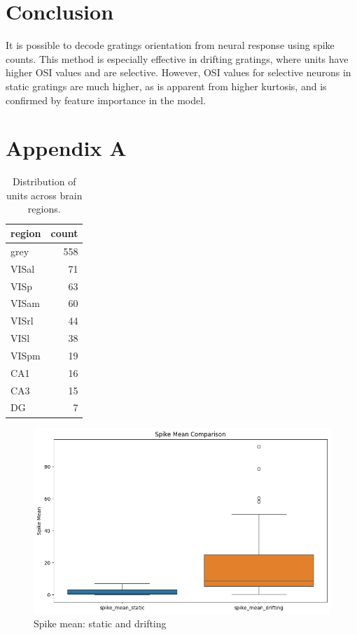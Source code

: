 \documentclass[10pt,twocolumn]{article}
\begin{document}
\section{Conclusion}

It is possible to decode gratings orientation from neural response using spike counts. This method is especially effective in drifting gratings, where units have higher OSI values and are selective. However, OSI values for selective neurons in static gratings are much higher, as is apparent from higher kurtosis, and is confirmed by feature importance in the model.

\newpage

\appendix

\section{Appendix A}

\begin{table}[h]
\centering
\begin{tabular}{lr}
\toprule
region & count \\
\midrule
grey   & 558 \\
VISal  &  71 \\
VISp   &  63 \\
VISam  &  60 \\
VISrl  &  44 \\
VISl   &  38 \\
VISpm  &  19 \\
CA1    &  16 \\
CA3    &  15 \\
DG     &   7 \\
\bottomrule
\end{tabular}
\caption{Distribution of units across brain regions.}
\label{tab:regions}
\end{table}

\begin{figure}[ht]
\centering
\includegraphics[width=0.85\linewidth]{report_images/spike_mean_comparison.png}
\caption{Spike mean: static and drifting}
\label{fig:spike_mean}
\end{figure}
\end{document}

